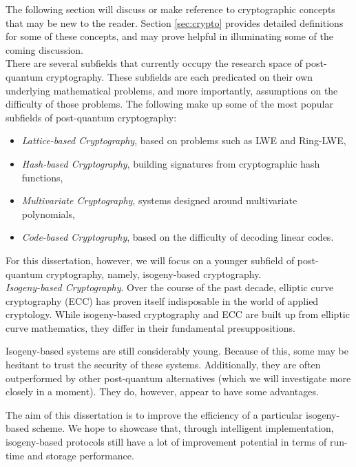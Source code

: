 The following section will discuss or make reference to cryptographic concepts that may be new to the reader. Section  \ref{sec:crypto} provides detailed definitions for some of these concepts, and may prove helpful in illuminating some of the coming discussion.\\

There are several subfields that currently occupy the research space of post-quantum cryptography. These subfields are each predicated on their own underlying mathematical problems, and more importantly, assumptions on the difficulty of those problems. The following make up some of the most popular subfields of post-quantum cryptography: 
\begin{itemize}
\item \textit{Lattice-based Cryptography}, based on problems such as LWE and Ring-LWE, 
\item \textit{Hash-based Cryptography}, building signatures from cryptographic hash functions, 
\item \textit{Multivariate Cryptography}, systems designed around multivariate polynomials, 
\item \textit{Code-based Cryptography}, based on the difficulty of decoding linear codes.
\end{itemize}

For this dissertation, however, we will focus on a younger subfield of post-quantum cryptography, namely, isogeny-based cryptography.\\

\noindent
\textit{Isogeny-based Cryptography}. Over the course of the past decade, elliptic curve cryptography (ECC) has proven itself indisposable in the world of applied cryptology. While isogeny-based cryptography and ECC are built up from elliptic curve mathematics, they differ in their fundamental presuppositions.

Isogeny-based systems are still considerably young. Because of this, some may be hesitant to trust the security of these systems. Additionally, they are often outperformed by other post-quantum alternatives (which we will investigate more closely in a moment). They do, however, appear to have some advantages. 

The aim of this dissertation is to improve the efficiency of a particular isogeny-based scheme. We hope to showcase that, through intelligent implementation, isogeny-based protocols still have a lot of improvement potential in terms of run-time and storage performance.

